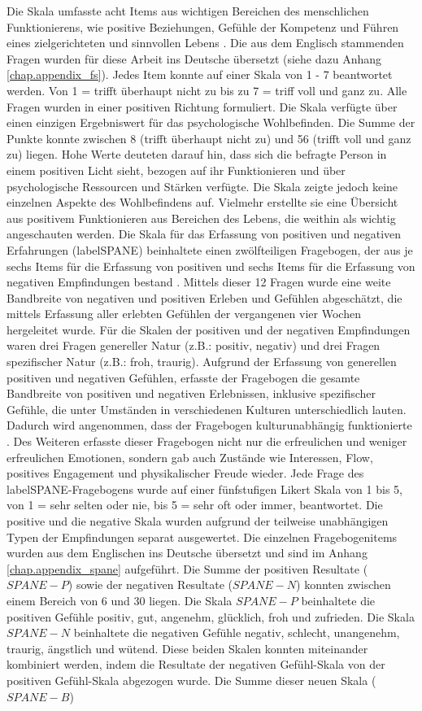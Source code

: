 Die Skala umfasste acht Items aus wichtigen Bereichen des menschlichen Funktionierens, wie positive Beziehungen, Gefühle der Kompetenz und Führen eines zielgerichteten und sinnvollen Lebens \cite{Diener:2010}. Die aus dem Englisch stammenden Fragen wurden für diese Arbeit ins Deutsche übersetzt (siehe dazu Anhang \ref{chap.appendix_fs}). Jedes Item konnte auf einer Skala von 1 - 7 beantwortet werden. Von 1 = trifft überhaupt nicht zu bis zu 7 = triff voll und ganz zu. Alle Fragen wurden in einer positiven Richtung formuliert. Die Skala verfügte über einen einzigen Ergebniswert für das psychologische Wohlbefinden. Die Summe der Punkte konnte zwischen 8 (trifft überhaupt nicht zu) und 56 (trifft voll und ganz zu) liegen. Hohe Werte deuteten darauf hin, dass sich die befragte Person in einem positiven Licht sieht, bezogen auf ihr Funktionieren und über psychologische Ressourcen und Stärken verfügte. Die Skala zeigte jedoch keine einzelnen Aspekte des Wohlbefindens auf. Vielmehr erstellte sie eine Übersicht aus positivem Funktionieren aus Bereichen des Lebens, die weithin als wichtig angeschauten werden. Die Skala für das Erfassung von positiven und negativen Erfahrungen (\gls{labelSPANE}) beinhaltete einen zwölfteiligen Fragebogen, der aus je sechs Items für die Erfassung von positiven und sechs Items für die Erfassung von negativen Empfindungen bestand \cite{Diener:2010}. Mittels dieser 12 Fragen wurde eine weite Bandbreite von negativen und positiven Erleben und Gefühlen abgeschätzt, die mittels Erfassung aller erlebten Gefühlen der vergangenen vier Wochen hergeleitet wurde. Für die Skalen der positiven und der negativen Empfindungen waren drei Fragen genereller Natur (z.B.: positiv, negativ) und drei Fragen spezifischer Natur (z.B.: froh, traurig). Aufgrund der Erfassung von generellen positiven und negativen Gefühlen, erfasste der Fragebogen die gesamte Bandbreite von positiven und negativen Erlebnissen, inklusive spezifischer Gefühle, die unter Umständen in verschiedenen Kulturen unterschiedlich lauten. Dadurch wird angenommen, dass der Fragebogen kulturunabhängig funktionierte \cite{Silva2013}. Des Weiteren erfasste dieser Fragebogen nicht nur die erfreulichen und weniger erfreulichen Emotionen, sondern gab auch Zustände wie Interessen, Flow, positives Engagement und physikalischer Freude wieder. Jede Frage des \gls{labelSPANE}-Fragebogens wurde auf einer fünfstufigen Likert Skala von 1 bis 5, von 1 = sehr selten oder nie, bis 5 = sehr oft oder immer, beantwortet. Die positive und die negative Skala wurden aufgrund der teilweise unabhängigen Typen der Empfindungen separat ausgewertet. Die einzelnen Fragebogenitems wurden aus dem Englischen ins Deutsche übersetzt und sind im Anhang \ref{chap.appendix_spane} aufgeführt. Die Summe der positiven Resultate ($SPANE-P$) sowie der negativen Resultate ($SPANE-N$) konnten zwischen einem Bereich von 6 und 30 liegen. Die Skala $SPANE-P$ beinhaltete die positiven Gefühle positiv, gut, angenehm, glücklich, froh und zufrieden. Die Skala $SPANE-N$ beinhaltete die negativen Gefühle negativ, schlecht, unangenehm, traurig, ängstlich und wütend. Diese beiden Skalen konnten miteinander kombiniert werden, indem die Resultate der negativen Gefühl-Skala von der positiven Gefühl-Skala abgezogen wurde. Die Summe dieser neuen Skala ($SPANE-B$) 